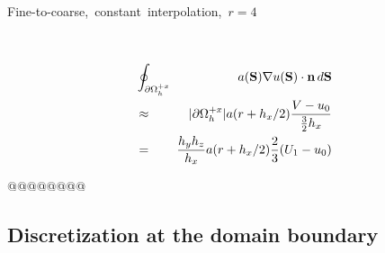 \documentclass[10pt]{article}
\begin{document}
\begin{minipage}{1.75in}
\mbox{Fine-to-coarse, constant interpolation, $r=4$} \\
\end{minipage} \ \ \ \ 
\begin{minipage}{4.00in}
\begin{eqnarray*}
& \oint_{\partial\Omega_h^{+x}} \!\!\! & a(\textbf{S}) \nabla u(\textbf{S})\cdot \textbf{n} \, d\textbf{S}  \\
& \approx & |\partial\Omega_h^{+x}| a(r+h_x/2) \frac{V - u_0}{\frac{3}{2}h_x} \\
& = & \frac{h_yh_z}{h_x}  a(r+h_x/2) \frac{2}{3} (U_1 - u_0)   \\
\end{eqnarray*}
\end{minipage}

@@@@@@@@

\subsection{Discretization at the domain boundary} \label{ss:discret-boundary}



\end{document}
